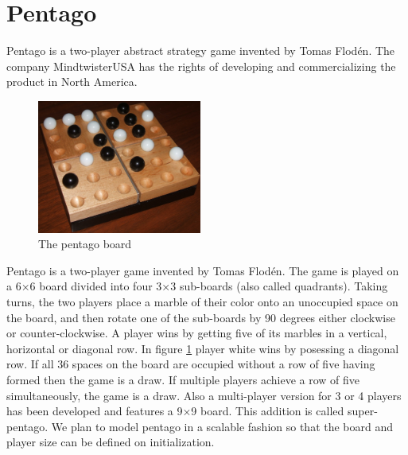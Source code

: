 \section{Pentago}
\label{Pentago}
Pentago is a two-player abstract strategy game invented by Tomas Flodén. 
The company MindtwisterUSA \cite{MindTwisterUSA} has the rights of developing and commercializing the product in North America. %


\begin{figure}
  \begin{center}
    \includegraphics[width=0.48\textwidth]{Images/Pentago-Game-Winning-Position.jpg}
  \end{center}
  \caption{The pentago board}
  \label{fig:boardpic}
\end{figure}

\vspace{6pt}

Pentago is a two-player game invented by Tomas Flodén. 
The game is played on a 6×6 board divided into four 3×3 sub-boards (also called quadrants). 
Taking turns, the two players place a marble of their color onto an unoccupied space on the board, and then rotate one of the sub-boards by 90 degrees either clockwise or counter-clockwise. 
A player wins by getting five of its marbles in a vertical, horizontal or diagonal row. 
In figure \ref{fig:boardpic} player white wins by posessing a diagonal row. 
If all 36 spaces on the board are occupied without a row of five having formed then the game is a draw.
If multiple players achieve a row of five simultaneously, the game is a draw.
Also a multi-player version for 3 or 4 players has been developed and features a 9×9 board. 
This addition is called super-pentago. 
We plan to model pentago in a scalable fashion so that the board and player size can be defined on initialization.
